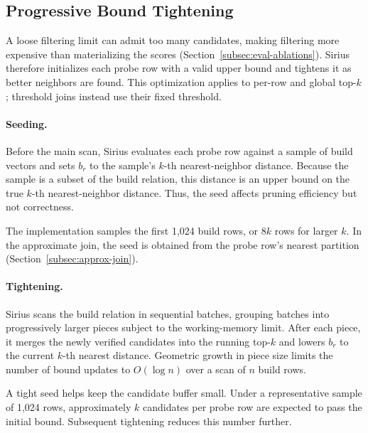 \subsection{Progressive Bound Tightening}\label{subsec:exact-bound}

A loose filtering limit can admit too many candidates, making
filtering more expensive than materializing the scores
(Section~\ref{subsec:eval-ablations}). Sirius therefore initializes
each probe row with a valid upper bound and tightens it as better
neighbors are found. This optimization applies to per-row and global
top-$k$; threshold joins instead use their fixed threshold.

\paragraph{Seeding.}
Before the main scan, Sirius evaluates each probe row against a sample
of build vectors and sets $b_r$ to the sample's $k$-th nearest-neighbor
distance. Because the sample is a subset of the build relation, this
distance is an upper bound on the true $k$-th nearest-neighbor distance.
Thus, the seed affects pruning efficiency but not correctness.

The implementation samples the first 1,024 build rows, or $8k$ rows
for larger $k$. In the approximate join, the seed is obtained from the
probe row's nearest partition (Section~\ref{subsec:approx-join}).


\paragraph{Tightening.}
Sirius scans the build relation in sequential batches, grouping batches
into progressively larger pieces subject to the working-memory limit.
After each piece, it merges the newly verified candidates into the
running top-$k$ and lowers $b_r$ to the current $k$-th nearest distance.
Geometric growth in piece size limits the number of bound updates to
$O(\log n)$ over a scan of $n$ build rows.

A tight seed helps keep the candidate buffer small. Under a representative
sample of 1,024 rows, approximately $k$ candidates per probe row are
expected to pass the initial bound. Subsequent tightening reduces this
number further.

